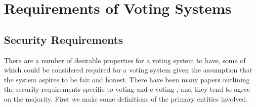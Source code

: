 
\chapter{Requirements of Voting Systems}
\label{ch:req}

\section{Security Requirements}
\label{ch:req:sec}

There are a number of desirable properties for a voting system to have, some of which could be considered required for a voting system given the assumption that the system aspires to be fair and honest. There have been many papers outlining the security requirements specific to voting and e-voting \cite{epsteinElectronicVoting2007,delauneFormalisingSecurityProperties2010,liTaxonomyComparisonRemote2014,hastingsSecurityConsiderationsRemote2011}, and they tend to agree on the majority. First we make some definitions of the primary entities involved:

